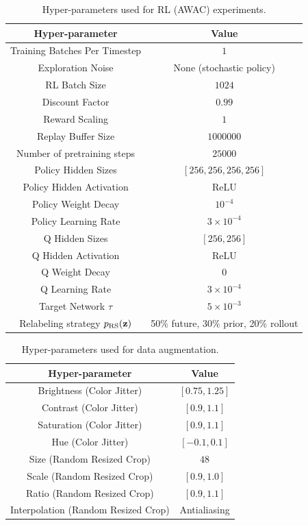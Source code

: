 \documentclass[letterpaper, 10 pt, conference]{ieeeconf}  %
\begin{document}
\begin{table}[h!]
    \centering
    \begin{tabular}{c|c}
    \hline
    \textbf{Hyper-parameter} & \textbf{Value} \\
    \hline
    Training Batches Per Timestep & $1$\\
    Exploration Noise & None (stochastic policy) \\
    RL Batch Size & $1024$ \\
    Discount Factor & $0.99$\\
    Reward Scaling & $1$\\
    Replay Buffer Size & $1000000$\\
    Number of pretraining steps & $25000$ \\
    Policy Hidden Sizes & $[256, 256, 256, 256]$\\
    Policy Hidden Activation & ReLU\\
    Policy Weight Decay & $10^{-4}$ \\
    Policy Learning Rate & $3 \times 10^{-4}$\\
    Q Hidden Sizes & $[256, 256]$\\
    Q Hidden Activation & ReLU\\
    Q Weight Decay & $0$ \\
    Q Learning Rate & $3 \times 10^{-4}$\\
    Target Network $\tau$ & $5\times10^{-3}$ \\
    Relabeling strategy $p_\text{RS}(\mathbf{z})$ & 50\% future, 30\% prior, 20\% rollout \\
    \hline
    \end{tabular}
\caption{Hyper-parameters used for RL (AWAC) experiments.}
\label{table:awac-hyperparams}
\end{table}

\begin{table}[h!]
    \centering
    \begin{tabular}{c|c}
    \hline
    \textbf{Hyper-parameter} & \textbf{Value} \\
    \hline
    Brightness (Color Jitter) & $[0.75,1.25]$\\
    Contrast (Color Jitter) & $[0.9,1.1]$\\
    Saturation (Color Jitter) & $[0.9,1.1]$\\
    Hue (Color Jitter) & $[-0.1,0.1]$\\
    Size (Random Resized Crop) & $48$\\
    Scale (Random Resized Crop) & $[0.9, 1.0]$\\
    Ratio (Random Resized Crop) & $[0.9, 1.1]$\\
    Interpolation (Random Resized Crop) & Antialiasing\\
    \hline
    \end{tabular}
\caption{Hyper-parameters used for data augmentation.}
\label{table:data-hyperparams}
\end{table}
\end{document}
